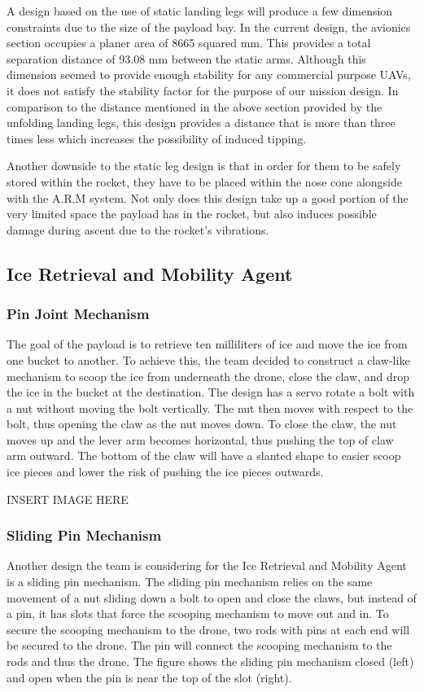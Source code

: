 			A design based on the use of static landing legs will produce a few dimension constraints due to the size of the payload bay. In the current design, the avionics section occupies a planer area of 8665 squared mm. This provides a total separation distance of 93.08 mm between the static arms. Although this dimension seemed to provide enough stability for any commercial purpose UAVs, it does not satisfy the stability factor for the purpose of our mission design. In comparison to the distance mentioned in the above section provided by the unfolding landing legs, this design provides a distance that is more than three times less which increases the possibility of induced tipping. 

			Another downside to the static leg design is that in order for them to be safely stored within the rocket, they have to be placed within the nose cone alongside with the A.R.M system. Not only does this design take up a good portion of the very limited space the payload has in the rocket, but also induces possible damage during ascent due to the rocket’s vibrations.  
		

	\subsection{Ice Retrieval and Mobility Agent}
		\subsubsection{Pin Joint Mechanism}
			The goal of the payload is to retrieve ten milliliters of ice and move the ice from one bucket to another. To achieve this, the team decided to construct a claw-like mechanism to scoop the ice from underneath the drone, close the claw, and drop the ice in the bucket at the destination. The design has a servo rotate a bolt with a nut without moving the bolt vertically. The nut then moves with respect to the bolt, thus opening the claw as the nut moves down. To close the claw, the nut moves up and the lever arm becomes horizontal, thus pushing the top of claw arm outward. The bottom of the claw will have a slanted shape to easier scoop ice pieces and lower the risk of pushing the ice pieces outwards. 

			INSERT IMAGE HERE

		\subsubsection{Sliding Pin Mechanism}
			Another design the team is considering for the Ice Retrieval and Mobility Agent is a sliding pin mechanism. The sliding pin mechanism relies on the same movement of a nut sliding down a bolt to open and close the claws, but instead of a pin, it has slots that force the scooping mechanism to move out and in. To secure the scooping mechanism to the drone, two rods with pins at each end will be secured to the drone. The pin will connect the scooping mechanism to the rods and thus the drone. The figure shows the sliding pin mechanism closed (left) and open when the pin is near the top of the slot (right). 

